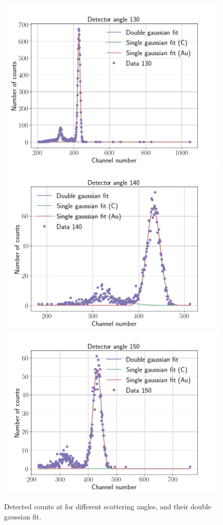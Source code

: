 \begin{figure}[t]
\includegraphics[width=0.99\columnwidth]{Data_130}
\includegraphics[width=0.99\columnwidth]{Data_140}
\includegraphics[width=0.99\columnwidth]{Data_150}
\caption{Detected counts at for different scattering angles, and their double gaussian fit.}
\label{fig_angular_dependency}
\end{figure}
